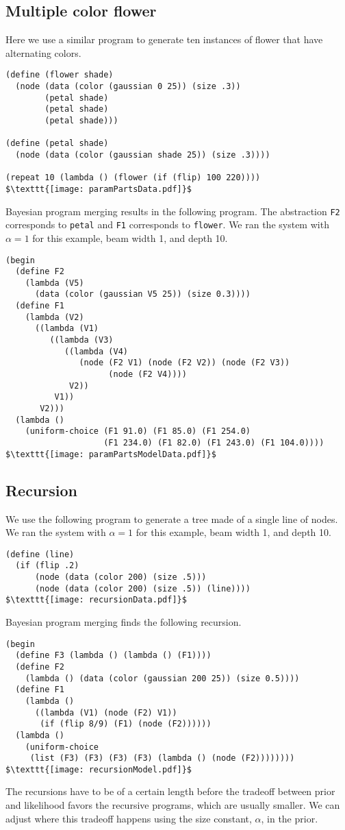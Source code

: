 \documentclass[a4paper,10pt]{article}
\begin{document}
\subsection{Multiple color flower}
Here we use a similar program to generate ten instances of flower that have alternating colors.  
\begin{lstlisting}[mathescape=true]
(define (flower shade)
  (node (data (color (gaussian 0 25)) (size .3))
        (petal shade)
        (petal shade)
        (petal shade)))

(define (petal shade)
  (node (data (color (gaussian shade 25)) (size .3))))

(repeat 10 (lambda () (flower (if (flip) 100 220))))
$\texttt{[image: paramPartsData.pdf]}$
\end{lstlisting}
Bayesian program merging results in the following program.  The abstraction \texttt{F2} corresponds to \texttt{petal} and \texttt{F1} corresponds to \texttt{flower}.  We ran the system with $\alpha=1$ for this example, beam width 1, and depth 10.
\begin{lstlisting}[mathescape=true]
(begin
  (define F2
    (lambda (V5)
      (data (color (gaussian V5 25)) (size 0.3))))
  (define F1
    (lambda (V2)
      ((lambda (V1)
         ((lambda (V3)
            ((lambda (V4)
               (node (F2 V1) (node (F2 V2)) (node (F2 V3))
                     (node (F2 V4))))
             V2))
          V1))
       V2)))
  (lambda ()
    (uniform-choice (F1 91.0) (F1 85.0) (F1 254.0)
                    (F1 234.0) (F1 82.0) (F1 243.0) (F1 104.0))))
$\texttt{[image: paramPartsModelData.pdf]}$
\end{lstlisting}
\subsection{Recursion}
We use the following program to generate a tree made of a single line of nodes.  We ran the system with $\alpha=1$ for this example, beam width 1, and depth 10.
\begin{lstlisting}[mathescape=true]
(define (line)
  (if (flip .2)
      (node (data (color 200) (size .5)))
      (node (data (color 200) (size .5)) (line))))
$\texttt{[image: recursionData.pdf]}$
\end{lstlisting}
Bayesian program merging finds the following recursion.
\begin{lstlisting}[mathescape=true]
(begin 
  (define F3 (lambda () (lambda () (F1))))
  (define F2
    (lambda () (data (color (gaussian 200 25)) (size 0.5))))
  (define F1
    (lambda ()
      ((lambda (V1) (node (F2) V1))
       (if (flip 8/9) (F1) (node (F2))))))
  (lambda ()
    (uniform-choice
     (list (F3) (F3) (F3) (F3) (lambda () (node (F2))))))))
$\texttt{[image: recursionModel.pdf]}$
\end{lstlisting}
The recursions have to be of a certain length before the tradeoff between prior and likelihood favors the recursive programs, which are usually smaller.  We can adjust where this tradeoff happens using the size constant, $\alpha$, in the prior. 
\end{document}
